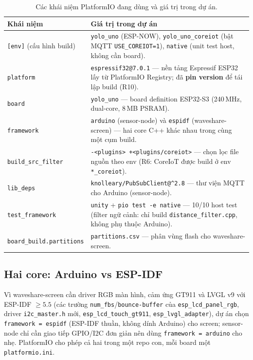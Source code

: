\begin{center}
\small
\renewcommand{\arraystretch}{1.2}
\begin{longtable}{@{}p{5.2cm}p{11.2cm}@{}}
\caption{Các khái niệm PlatformIO đang dùng và giá trị trong dự án.}\\
\toprule
\textbf{Khái niệm} & \textbf{Giá trị trong dự án} \\
\midrule
\endhead
\texttt{[env]} (cấu hình build) &
\texttt{yolo\_uno} (ESP-NOW), \texttt{yolo\_uno\_coreiot} (bật MQTT
\texttt{USE\_COREIOT=1}), \texttt{native} (unit test host, không cần board). \\
\texttt{platform} &
\texttt{espressif32@7.0.1} — nền tảng Espressif ESP32 lấy từ PlatformIO
Registry; đã \textbf{pin version} để tái lập build (R10). \\
\texttt{board} &
\texttt{yolo\_uno} — board definition ESP32-S3 (240\,MHz, dual-core,
8\,MB PSRAM). \\
\texttt{framework} &
\texttt{arduino} (sensor-node) và \texttt{espidf} (waveshare-screen) —
hai core C++ khác nhau trong cùng một cụm build. \\
\texttt{build\_src\_filter} &
\texttt{-<plugins> +<plugins/coreiot>} — chọn lọc file nguồn theo env
(R6: CoreIoT được build ở env \texttt{*\_coreiot}). \\
\texttt{lib\_deps} &
\texttt{knolleary/PubSubClient@\^{}2.8} — thư viện MQTT cho Arduino
(sensor-node). \\
\texttt{test\_framework} &
\texttt{unity} + \texttt{pio test -e native} — 10/10 host test (filter ngữ
cảnh: chỉ build \texttt{distance\_filter.cpp}, không phụ thuộc Arduino). \\
\texttt{board\_build.partitions} &
\texttt{partitions.csv} — phân vùng flash cho waveshare-screen. \\
\bottomrule
\end{longtable}
\end{center}

\subsection{Hai core: Arduino vs ESP-IDF}

Vì waveshare-screen cần driver RGB màn hình, cảm ứng GT911 và LVGL v9 với
ESP-IDF $\ge 5.5$ (các trường \texttt{num\_fbs}/\texttt{bounce-buffer} của
\texttt{esp\_lcd\_panel\_rgb}, driver \texttt{i2c\_master.h} mới,
\texttt{esp\_lcd\_touch\_gt911}, \texttt{esp\_lvgl\_adapter}), dự án chọn
\texttt{framework = espidf} (ESP-IDF thuần, không dính Arduino) cho screen;
sensor-node chỉ cần giao tiếp GPIO/I2C đơn giản nên dùng
\texttt{framework = arduino} cho nhẹ. PlatformIO cho phép cả hai trong một
repo con, mỗi board một \texttt{platformio.ini}.

